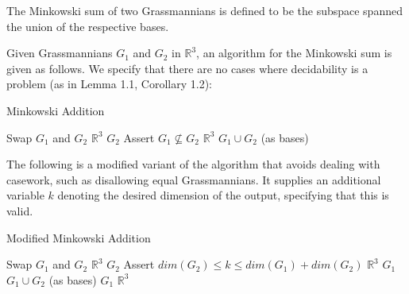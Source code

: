 \documentclass[12pt]{article}
\newcommand{\R}{\mathbb{R}}
\newenvironment{definition}[2][Definition]{\begin{trivlist}
\item[\hskip \labelsep {\bfseries #1}\hskip \labelsep {\bfseries #2.}]}{\end{trivlist}}
\newenvironment{proposition}[2][Proposition]{\begin{trivlist}
\item[\hskip \labelsep {\bfseries #1}\hskip \labelsep {\bfseries #2.}]}{\end{trivlist}}
\begin{document}
\begin{definition}{2.1}
The Minkowski sum of two Grassmannians is defined to be the subspace spanned the union of the respective bases.
\end{definition}

\begin{proposition}{2.2}
Given Grassmannians \(G_1\) and \(G_2\) in \(\R^3\), an algorithm for the Minkowski sum is given as follows. We specify that there are no cases where decidability is a problem (as in Lemma 1.1, Corollary 1.2):

\begin{algorithm}[H]
\caption{Minkowski Addition}
\begin{algorithmic}[1]
\State Swap $G_1$ and $G_2$
\EndIf
{}
\Return $\R^3$
\Return $G_2$
\EndIf
\State Assert $G_1 \not\subseteq G_2$
\Return $\R^3$
\Return $G_1 \cup G_2$ (as bases)
\Else{
\Return $\R^3$
}
\EndIf
\EndProcedure
\end{algorithmic}
\end{algorithm}

\end{proposition}

\begin{proposition}{2.3}
The following is a modified variant of the algorithm that avoids dealing with casework, such as disallowing equal Grassmannians. It supplies an additional variable \(k\) denoting the desired dimension of the output, specifying that this is valid.

\begin{algorithm}[H]
\caption{Modified Minkowski Addition}
\begin{algorithmic}[2]
\State Swap $G_1$ and $G_2$
\EndIf
{}
\Return $\R^3$
\Return $G_2$
\EndIf
\State Assert $dim(G_2) \leq k \leq dim(G_1) + dim(G_2)$
\Return $\R^3$
\Return $G_1$
\Return $G_1 \cup G_2$ (as bases)
\Return $G_1$
\Return $\R^3$
\EndIf
\EndProcedure
\end{algorithmic}
\end{algorithm}

\end{proposition}
\end{document}
